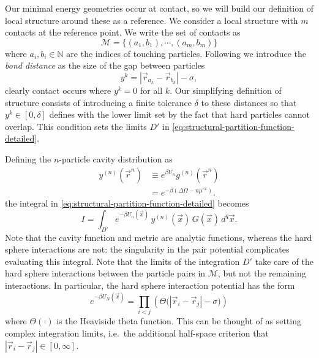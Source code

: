 \documentclass[11pt,twoside]{report}
\begin{document}
Our minimal energy geometries occur at contact, so we will build our definition of local structure around these as a reference.
We consider a local structure with $m$ contacts at the reference point.
We write the set of contacts as
\begin{equation}
  \mathcal{M} = \{(a_1, b_1), \cdots, (a_m, b_m)\}
\end{equation}
where $a_i, b_i \in \mathbb{N}$ are the indices of touching particles.
Following \cite{Holmes?} we introduce the \emph{bond distance} as the size of the gap between particles
\begin{equation}
  y^k = |\vec{r}_{a_k} - \vec{r}_{b_k}| - \sigma,
\end{equation}
clearly contact occurs where $y^k = 0$ for all $k$.
Our simplifying definition of structure consists of introducing a finite tolerance $\delta$ to these distances so that $y^k \in [0, \delta]$ defines with the lower limit set by the fact that hard particles cannot overlap.
This condition sets the limits $D'$ in \eqref{eq:structural-partition-function-detailed}.

Defining the $n$-particle cavity distribution as
\begin{equation}
  \begin{split}
    y^{(n)}(\vec{r}^n)
    &\equiv e^{\beta U_n} g^{(n)}(\vec{r}^n) \\
    &= e^{-\beta(\Delta\Omega - n\mu^{ex})}.
  \end{split}
\end{equation}
the integral in \eqref{eq:structural-partition-function-detailed} becomes
\begin{equation}
  I
  =
  \int_{D'}
  e^{-\beta U_n(\vec{x})} \, y^{(n)}(\vec{x}) \, G(\vec{x})
  \, d^{q} \vec{x}.
\end{equation}
Note that the cavity function and metric are analytic functions, whereas the hard sphere interactions are not: the singularity in the pair potential complicates evaluating this integral.
Note that the limits of the integration $D'$ take care of the hard sphere interactions between the particle pairs in $\mathcal{M}$, but not the remaining interactions.
In particular, the hard sphere interaction potential has the form
\begin{equation}
  e^{-\beta U_N(\vec{x})} =
  \prod_{i < j} \left(
  \Theta \Big( |\vec{r}_i - \vec{r}_j| - \sigma \Big)
  \right)
\end{equation}
where $\Theta(\cdot)$ is the Heaviside theta function.
This can be thought of as setting complex integration limits, i.e.\ the additional half-space criterion that $|\vec{r}_i - \vec{r}_j| \in [0, \infty]$.
\end{document}
